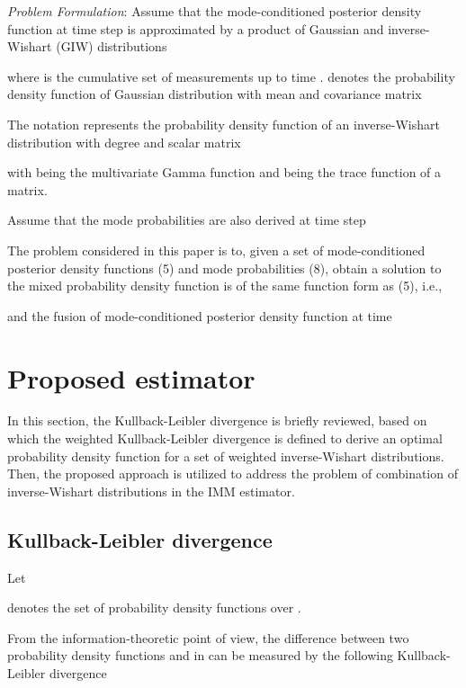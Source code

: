\documentclass[12pt,draftcls,onecolumn]{IEEEtran}
\begin{document}
\emph{Problem Formulation}: Assume that the mode-conditioned
posterior density function at time step  is approximated by a
product of Gaussian and inverse-Wishart (GIW) distributions

where  is the cumulative
set of measurements up to time . 
denotes the probability density function of Gaussian distribution
with mean  and covariance matrix 

The notation  represents the
probability density function of an inverse-Wishart distribution with
degree  and scalar matrix 

with  being the multivariate Gamma function and
 being the trace function of a matrix.


Assume that the mode probabilities are also derived at time step




The problem considered in this paper is to, given a set of
mode-conditioned posterior density functions (5) and mode
probabilities (8), obtain a solution to the mixed probability
density function is of the same function form as (5), i.e.,

and the fusion of mode-conditioned posterior density function at
time 



\section{Proposed estimator}


In this section, the Kullback-Leibler divergence is briefly
reviewed, based on which the weighted Kullback-Leibler divergence is
defined to derive an optimal probability density function for a set
of weighted inverse-Wishart distributions. Then, the proposed
approach is utilized to address the problem of combination of
inverse-Wishart distributions in the IMM estimator.


\subsection{Kullback-Leibler divergence}


Let

denotes the set of probability density functions over
.


From the information-theoretic point of view, the difference between
two probability density functions  and  in 
can be measured by the following Kullback-Leibler divergence
\end{document}
